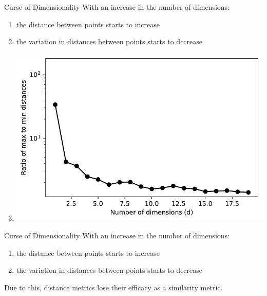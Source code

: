 \documentclass[usenames,dvipsnames]{beamer}
\begin{document}
\begin{frame}{Curse of Dimensionality}
With an increase in the number of dimensions:
\begin{enumerate}
\item the distance between points starts to increase
\item the variation in distances between points starts to decrease
\item[] {\centering \includegraphics[height=0.6\textheight]{knn/curse_spread.pdf}}
\end{enumerate}
\end{frame}

\begin{frame}{Curse of Dimensionality}
With an increase in the number of dimensions:
\begin{enumerate}
\item the distance between points starts to increase
\item the variation in distances between points starts to decrease
\end{enumerate}
Due to this, distance metrics lose their efficacy as a similarity metric.
\end{frame}
\end{document}

